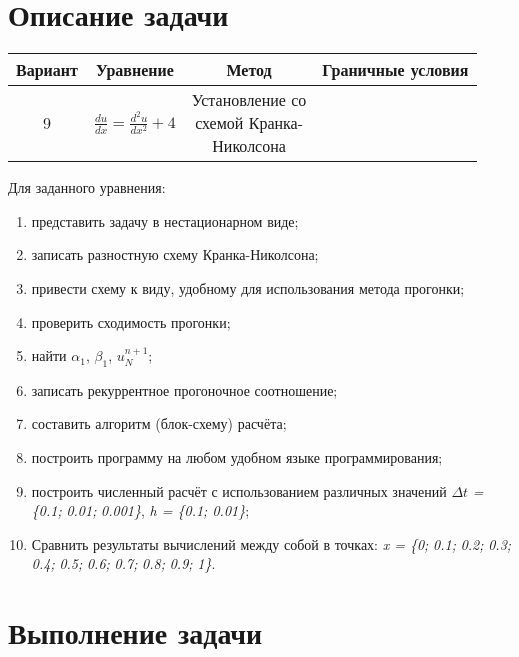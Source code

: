 \documentclass[12pt, a4paper]{report}
\begin{document}
	\section*{Описание задачи}
	\large
	\begin{center}
		\begin{tabular}{||c|c|c|c||}
			\hline
			Вариант & Уравнение & Метод & Граничные условия \\
			\hline
			9 & $ \frac{du}{dx}=\frac{d^{2}u}{dx^{2}}+4$ & \makecell{Установление со \\ схемой Кранка- \\ Николсона} & \makecell{$ \begin{cases} u(t, x = 0) = 1 \\ u(t, x = 1) = 6.7 \end{cases}$} \\

			\hline
		\end{tabular}
	\end{center}
	\par
	Для заданного уравнения:
	\begin{enumerate}
		\item представить задачу в нестационарном виде;
		\item записать разностную схему Кранка-Николсона;
		\item привести схему к виду, удобному для использования метода прогонки;
		\item проверить сходимость прогонки;
		\item найти $\alpha_1$, $\beta_1$, $u_{N}^{n+1}$;
		\item записать рекуррентное прогоночное соотношение;
		\item составить алгоритм (блок-схему) расчёта;
		\item построить программу на любом удобном языке программирования;
		\item построить численный расчёт с использованием различных значений $\Delta t$ \textit{= \{0.1;} \textit{0.01;} \textit{0.001\}}, \textit{h = \{0.1; 0.01\}};
		\item Сравнить результаты вычислений между собой в точках: \textit{x = \{0;} \textit{0.1;} \textit{0.2;} \textit{0.3;} \textit{0.4;} \textit{0.5;} \textit{0.6;} \textit{0.7;} \textit{0.8;} \textit{0.9;} \textit{1\}}.
	\end{enumerate}

	\newpage

	\section*{Выполнение задачи}
\end{document}
